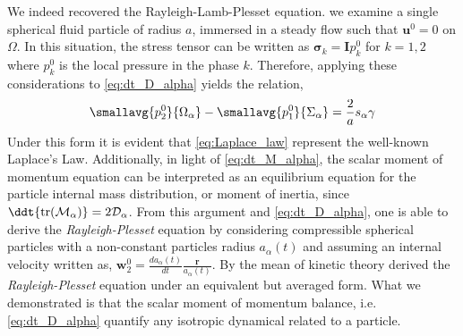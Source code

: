 We indeed recovered the Rayleigh-Lamb-Plesset equation. 
 we examine a single spherical fluid particle of radius $a$, immersed in a steady flow such that $\textbf{u}^0 = 0$ on $\Omega$. 
In this situation, the stress tensor can be written as $\bm{\sigma}_k = \textbf{I} p_k^0$ for $k = 1, 2$ where $p_k^0$ is the local pressure in the phase $k$. 
Therefore, applying these considerations to \ref{eq:dt_D_alpha} yields the relation, 
\begin{equation*}
    \smallavg{p_2^0}{\Omega_\alpha} 
    - \smallavg{p_1^0}{\Sigma_\alpha}
    =
    \frac{2}{a} s_\alpha \gamma
    \label{eq:Laplace_law}
\end{equation*}
Under this form it is evident that \ref{eq:Laplace_law} represent the well-known Laplace's Law. 
Additionally, in light of \ref{eq:dt_M_alpha}, the scalar moment of momentum equation can be interpreted as an equilibrium equation for the particle internal mass distribution, or moment of inertia, since $\ddt{\text{tr}(\mathcal{M}_\alpha)} = 2 \mathcal{D}_\alpha$. 
From this argument and \ref{eq:dt_D_alpha}, one is able to derive the \textit{Rayleigh-Plesset} equation by considering compressible spherical particles with a non-constant particles radius $a_\alpha(t)$ and assuming an internal velocity written as, $\textbf{w}^0_2 = \frac{d a_\alpha(t)}{dt}  \frac{\textbf{r}}{a_\alpha(t)}$. 
By the mean of kinetic theory \citet{zhang1994averaged} derived the \textit{Rayleigh-Plesset} equation under an equivalent but averaged form.
What we demonstrated is that the scalar moment of momentum balance, i.e. \ref{eq:dt_D_alpha} quantify any isotropic dynamical related to a particle. 
